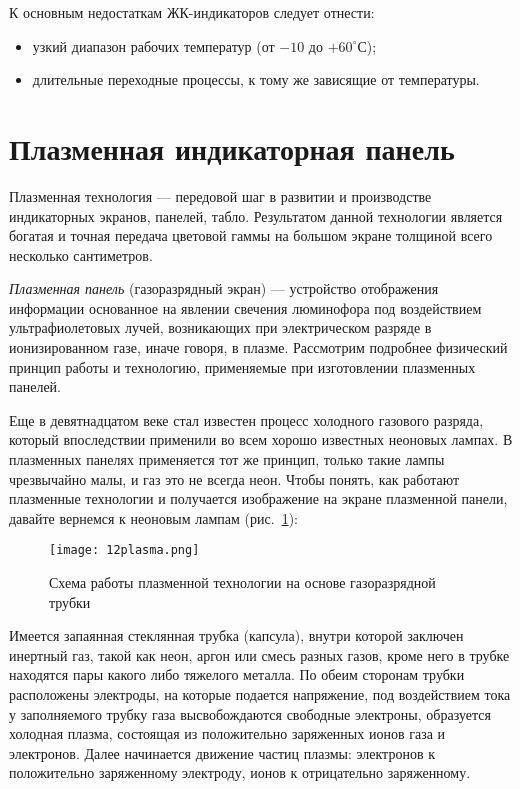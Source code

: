 К основным недостаткам ЖК-индикаторов следует отнести:
\begin{itemize}
\item узкий диапазон рабочих температур (от $ -10 $ до $ +60^\circ $С);
\item длительные переходные процессы, к тому же зависящие от температуры.
\end{itemize}

\section{Плазменная индикаторная панель}

Плазменная технология --- передовой шаг в развитии и производстве индикаторных экранов, панелей, табло. Результатом данной технологии является богатая и точная передача цветовой гаммы на большом экране толщиной всего несколько сантиметров. 

\textit{Плазменная панель} (газоразрядный экран) --- устройство отображения информации основанное на явлении свечения люминофора под воздействием ультрафиолетовых лучей, возникающих при электрическом разряде в ионизированном газе, иначе говоря, в плазме. Рассмотрим подробнее физический принцип работы и технологию, применяемые при изготовлении плазменных панелей.

Еще в девятнадцатом веке стал известен процесс холодного газового разряда, который впоследствии применили во всем хорошо известных неоновых лампах. В плазменных панелях применяется тот же принцип, только такие лампы чрезвычайно малы, и газ это не всегда неон. Чтобы понять, как работают плазменные технологии и получается изображение на экране плазменной панели, давайте вернемся к неоновым лампам (рис.~\ref{pic:12plasma}):

\begin{figure}[h!]
	\caption{ Схема работы плазменной технологии на основе газоразрядной трубки }
	\texttt{[image: 12plasma.png]}
	\label{pic:12plasma}
\end{figure}

Имеется запаянная стеклянная трубка (капсула), внутри которой заключен инертный газ, такой как неон, аргон или смесь разных газов, кроме него в трубке находятся пары какого либо тяжелого металла. По обеим сторонам трубки расположены электроды, на которые подается напряжение, под воздействием тока у заполняемого трубку газа высвобождаются свободные электроны, образуется  холодная плазма, состоящая из положительно заряженных ионов газа и  электронов. Далее начинается движение частиц плазмы: электронов к положительно заряженному электроду, ионов к отрицательно заряженному. 

